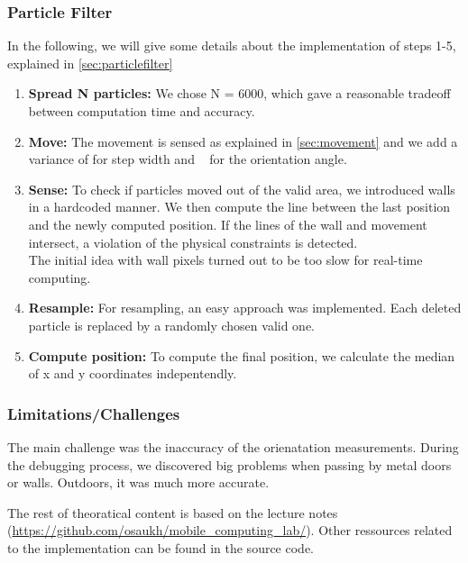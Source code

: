\documentclass[12pt]{article}
\begin{document}
\subsubsection*{Particle Filter}
In the following, we will give some details about the implementation of steps 1-5, explained in \ref{sec:particlefilter}
\begin{enumerate}
	\item \textbf{Spread N particles:} We chose N = 6000, which gave a reasonable tradeoff between computation time and accuracy. 
	\item \textbf{Move:} The movement is sensed as explained in \ref{sec:movement} and we add a variance of \textpm 20cm for step width and \textdegree~ for the orientation angle.
	\item \textbf{Sense:} To check if particles moved out of the valid area, we introduced walls in a hardcoded manner. We then compute the line between the last position and the newly computed position. If the lines of the wall and movement intersect, a violation of the physical constraints is detected.\\
	The initial idea with wall pixels turned out to be too slow for real-time computing.
	\item \textbf{Resample:} For resampling, an easy approach was implemented. Each deleted particle is replaced by a randomly chosen valid one.
	\item \textbf{Compute position:} To compute the final position, we calculate the median of x and y coordinates indepentendly. 
\end{enumerate}

\subsubsection{Limitations/Challenges}
The main challenge was the inaccuracy of the orienatation measurements. During the debugging process, we discovered big problems when passing by metal doors or walls. Outdoors, it was much more accurate.





The rest of theoratical content is based on the lecture notes (\url{https://github.com/osaukh/mobile_computing_lab/}). Other ressources related to the implementation can be found in the source code.
\end{document}
